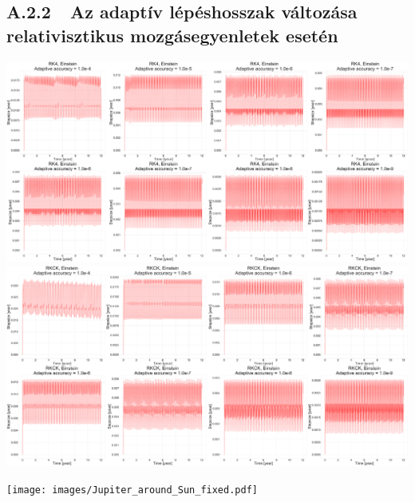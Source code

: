 \newpage

\subsection*{A.2.2\ \ Az adaptív lépéshosszak változása relativisztikus mozgásegyenletek esetén}

{\centering\includegraphics[width=\textwidth]{images/single_body/Mercury_adaptive_accuracy_einstein_runge.pdf}}
\label{fig:12}
\hfill \break \break
{\centering\includegraphics[width=\textwidth]{images/single_body/Mercury_adaptive_accuracy_einstein_rkck.pdf}}
\label{fig:13}

\newpage

{\centering\texttt{[image: images/Jupiter\_around\_Sun\_fixed.pdf]}}
\label{fig:14}